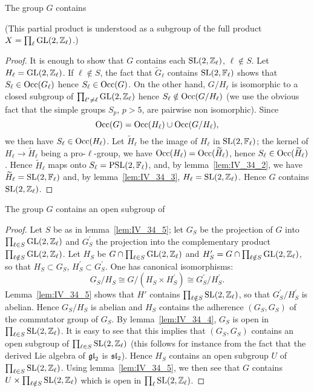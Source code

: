 \begin{lem}\label{lem:IV_34_5}
	The group $G$ contains 
\end{lem}
(This partial product is understood as a subgroup of the full product $X =
\prod_\ell \operatorname{GL}(2,\mathbb{Z}_\ell)$.)
\begin{proof}
	It is enough to show that $G$ contains each $\operatorname{SL}(2, \mathbb{Z}_\ell)$, $\ell
	\notin S$.  Let $H_\ell = \operatorname{GL}(2, \mathbb{Z}_\ell)$. If $\ell \notin S$, the
	fact that $\widetilde{G}_\ell$ contains $\operatorname{SL}(2, \mathbb{F}_\ell)$ shows that
	$S_\ell \in \operatorname{Occ}(G_\ell)$ hence $S_\ell \in \operatorname{Occ}(G)$. On the other
	hand, $G/H_\ell$ is isomorphic to a closed subgroup of
	$\prod_{\ell'\ne\ell} \operatorname{GL}(2, \mathbb{Z}_\ell)$ hence $S_\ell \notin
	\operatorname{Occ}(G/H_\ell)$ (we use the obvious fact that the simple groups $S_p$,
	$p > 5$, are pairwise non isomorphic). Since
	\[
		\operatorname{Occ}(G) = \operatorname{Occ}(H_\ell) \cup \operatorname{Occ}(G/H_\ell),
	\]
	we then have $S_\ell \in \operatorname{Occ}(H_\ell)$. Let $\widetilde{H}_\ell$ be the
	image of $H_\ell$ in $\operatorname{SL}(2, \mathbb{F}_\ell)$; the kernel of $H_\ell \to
	\widetilde{H}_\ell$ being a pro-$\ell$-group, we have $\operatorname{Occ}(H_\ell) =
	\operatorname{Occ}(\widetilde H_\ell)$, hence $S_\ell \in \operatorname{Occ}(\widetilde H_\ell)$.
	Hence $\widetilde H_\ell$ maps onto $S_\ell = \operatorname{PSL}(2,\mathbb{F}_\ell)$, and, by
	lemma~\ref{lem:IV_34_2}, we have $\widetilde H_\ell = \operatorname{SL}(2, \mathbb{F}_\ell)$
	and, by lemma~\ref{lem:IV_34_3}, $H_\ell = \operatorname{SL}(2, \mathbb{Z}_\ell)$. Hence $G$
	contains $\operatorname{SL}(2, \mathbb{Z}_\ell)$.
\end{proof}

\begin{lem}\label{lem:IV_34_6}
	The group $G$ contains an open subgroup of
\end{lem}
\begin{proof}
	Let $S$ be as in lemma~\ref{lem:IV_34_5}; let $G_S$ be the projection
	of $G$ into $\prod_{\ell\in S} \operatorname{GL}(2, \mathbb{Z}_\ell)$ and $G^\prime_S$ the
	projection into the complementary product $\prod_{\ell\notin S} \operatorname{GL}(2,
	\mathbb{Z}_\ell)$. Let $H_S$ be $G \cap \prod_{\ell\in S} \operatorname{GL}(2, \mathbb{Z}_\ell)$ and
	$H^\prime_S = G \cap \prod_{\ell\notin S} \operatorname{GL}(2, \mathbb{Z}_\ell)$, so that
	$H_S \subset G_S$, $H^\prime_S \subset G^\prime_S$. One has canonical
	isomorphisms:
	\dpage
	\[
		G_S/H_S \cong G/(H_S \times H_S^\prime) \cong
		G_S^\prime/H_S^\prime.
	\]
	Lemma~\ref{lem:IV_34_5} shows that $H'$ contains $\prod_{\ell\notin S}
	\operatorname{SL}(2, \mathbb{Z}_\ell)$, so that $G_S^\prime/H_S^\prime$ is abelian. Hence
	$G_S/H_S$ is abelian and $H_S$ contains the adherence $(G_S, G_S)$ of
	the commutator group of $G_S$. By lemma~\ref{lem:IV_34_4}, $G_S$ is
	open in $\prod_{\ell\in S} \operatorname{SL}(2, \mathbb{Z}_\ell)$. It is easy to see that
	this implies that $(G_S, G_S)$ contains an open subgroup of
	$\prod_{\ell\in S} \operatorname{SL}(2, \mathbb{Z}_\ell)$ (this follows for instance from the
	fact that the derived Lie algebra of $\operatorname{\mathfrak{gl}}_2$ is $\operatorname{\mathfrak{sl}}_2$). Hence $H_S$
	contains an open subgroup $U$ of $\prod_{\ell\in S} \operatorname{SL}(2, \mathbb{Z}_\ell)$.
	Using lemma~\ref{lem:IV_34_5}, we then see that $G$ contains $U \times
	\prod_{\ell\notin S} \operatorname{SL}(2, \mathbb{Z}_\ell)$ which is open in $\prod_\ell
	\operatorname{SL}(2, \mathbb{Z}_\ell)$.
\end{proof}

